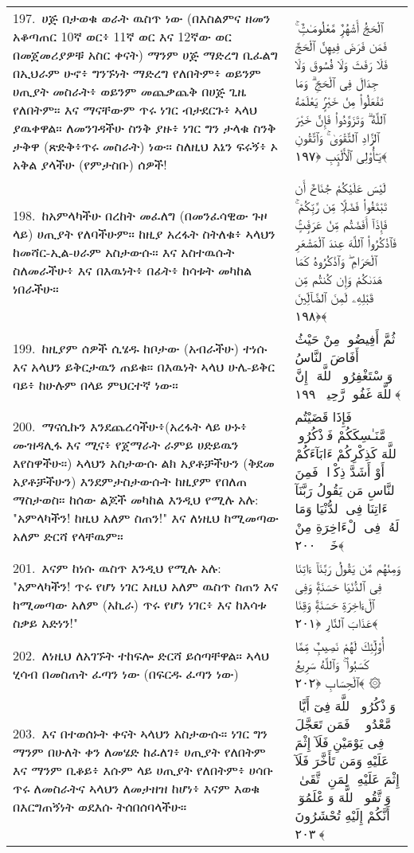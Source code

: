 \documentclass[11pt,a4paper,oneside]{article}%
\newcommand{\mytextarabic}[1]{\textarabic{ #1 \flushright}}
\begin{document}
\begin{longtable}{%
  @{}
    p{}
  @{~~~}
    p{}
    @{}
}
197.\ ሀጅ በታወቁ ወራት ዉስጥ ነው (በእስልምና ዘመን አቆጣጠር 10ኛ ወር፥ 11ኛ ወር እና 12ኛው ወር በመጀመሪያዎቹ አስር ቀናት) ማንም ሀጅ ማድረግ ቢፈልግ በኢህራም ሁኖ፥ ግንኙነት ማድረግ የለበትም፥ ወይንም ሀጢያት መስራት፥ ወይንም መጨቃጨቅ በሀጅ ጊዜ የለበትም። እና ማናቸውም ጥሩ ነገር ብታደርጉ፥ ኣላህ ያዉቀዋል። ለመንገዳችሁ ስንቅ ያዙ፥ ነገር ግን ታላቁ ስንቅ ታቅዋ (ጽድቅ፥ጥሩ መስራት) ነው። ስለዚህ እኔን ፍሩኝ፥ ኦ አቅል ያላችሁ (የምታስቡ) ሰዎች! &  \mytextarabic{ٱلْحَجُّ أَشْهُرٌۭ مَّعْلُومَـٰتٌۭ ۚ فَمَن فَرَضَ فِيهِنَّ ٱلْحَجَّ فَلَا رَفَثَ وَلَا فُسُوقَ وَلَا جِدَالَ فِى ٱلْحَجِّ ۗ وَمَا تَفْعَلُوا۟ مِنْ خَيْرٍۢ يَعْلَمْهُ ٱللَّهُ ۗ وَتَزَوَّدُوا۟ فَإِنَّ خَيْرَ ٱلزَّادِ ٱلتَّقْوَىٰ ۚ وَٱتَّقُونِ يَـٰٓأُو۟لِى ٱلْأَلْبَٟبِ ﴿١٩٧﴾}\\
198.\ ከአምላካችሁ በረከት መፈለግ (በመንፈሳዊው ጉዞ ላይ) ሀጢያት የለባችሁም። ከዚያ አረፋት ስትለቁ፥ ኣላህን ከመሻር-ኢል-ሀራም አስታውሱ። እና አስተዉሱት ስለመራችሁ፥ እና በእዉነት፥ በፊት፥ ከሳቱት መካከል ነበራችሁ።  &  \mytextarabic{ لَيْسَ عَلَيْكُمْ جُنَاحٌ أَن تَبْتَغُوا۟ فَضْلًۭا مِّن رَّبِّكُمْ ۚ فَإِذَآ أَفَضْتُم مِّنْ عَرَفَٟتٍۢ فَٱذْكُرُوا۟ ٱللَّهَ عِندَ ٱلْمَشْعَرِ ٱلْحَرَامِ ۖ وَٱذْكُرُوهُ كَمَا هَدَىٰكُمْ وَإِن كُنتُم مِّن قَبْلِهِۦ لَمِنَ ٱلضَّآلِّينَ ﴿١٩٨﴾}\\
199.\ ከዚያም ሰዎች ሲሄዱ ከቦታው (አብራችሁ) ተነሱ እና አላህን ይቅርታዉን ጠይቁ። በእዉነት ኣላህ ሁሌ-ይቅር ባይ፥ ከሁሉም በላይ ምህርተኛ ነው። &  \mytextarabic{ ثُمَّ أَفِيضُوا۟ مِنْ حَيْثُ أَفَاضَ ٱلنَّاسُ وَٱسْتَغْفِرُوا۟ ٱللَّهَ ۚ إِنَّ ٱللَّهَ غَفُورٌۭ رَّحِيمٌۭ ﴿١٩٩﴾}\\
200.\ ማናሲኩን እንደጨረሳችሁ፥(አረፋት ላይ ሁኑ፥ ሙዝዳሊፋ እና ሚና፥ የጀማራት ራምይ ሀድይዉን እየስዋችሁ።) ኣላህን አስታውሱ ልክ አያቶቻችሁን (ቅደመ አያቶቻችሁን) እንደምታስታውሱት ከዚያም የበለጠ ማስታወስ። ከሰው ልጆች መካከል እንዲህ የሚሉ አሉ: "አምላካችን! ከዚህ አለም ስጠን!" እና ለነዚህ ከሚመጣው አለም ድርሻ የላቸዉም። &  \mytextarabic{فَإِذَا قَضَيْتُم مَّنَـٰسِكَكُمْ فَٱذْكُرُوا۟ ٱللَّهَ كَذِكْرِكُمْ ءَابَآءَكُمْ أَوْ أَشَدَّ ذِكْرًۭا ۗ فَمِنَ ٱلنَّاسِ مَن يَقُولُ رَبَّنَآ ءَاتِنَا فِى ٱلدُّنْيَا وَمَا لَهُۥ فِى ٱلْءَاخِرَةِ مِنْ خَلَٟقٍۢ ﴿٢٠٠﴾}\\
201.\ እናም ከነሱ ዉስጥ እንዲህ የሚሉ አሉ: "አምላካችን! ጥሩ የሆነ ነገር እዚህ አለም ዉስጥ ስጠን እና ከሚመጣው አለም (አኪራ) ጥሩ የሆነ ነገር፥ እና ከእሳቱ ስቃይ አድነን!" &  \mytextarabic{وَمِنْهُم مَّن يَقُولُ رَبَّنَآ ءَاتِنَا فِى ٱلدُّنْيَا حَسَنَةًۭ وَفِى ٱلْءَاخِرَةِ حَسَنَةًۭ وَقِنَا عَذَابَ ٱلنَّارِ ﴿٢٠١﴾}\\
202.\ ለነዚህ ለአገኙት ተከፍሎ ድርሻ ይሰጣቸዋል። ኣላህ ሂሳብ በመስጠት ፈጣን ነው (በፍርዱ ፈጣን ነው) &  \mytextarabic{أُو۟لَٟٓئِكَ لَهُمْ نَصِيبٌۭ مِّمَّا كَسَبُوا۟ ۚ وَٱللَّهُ سَرِيعُ ٱلْحِسَابِ ﴿٢٠٢﴾ ۞}\\
203.\ እና በተወሰኑት ቀናት ኣላህን አስታውሱ። ነገር ግን ማንም በሁለት ቀን ለመሄድ ከፈለገ፥ ሀጢያት የለበትም እና ማንም ቢቆይ፥ እሱም ላይ ሀጢያት የለበትም፥ ሀሳቡ ጥሩ ለመስራትና ኣላህን ለመታዘዝ ከሆነ፥ እናም እወቁ በእርግጠኝነት ወደእሱ ትሰበሰባላችሁ። &  \mytextarabic{ وَٱذْكُرُوا۟ ٱللَّهَ فِىٓ أَيَّامٍۢ مَّعْدُودَٟتٍۢ ۚ فَمَن تَعَجَّلَ فِى يَوْمَيْنِ فَلَآ إِثْمَ عَلَيْهِ وَمَن تَأَخَّرَ فَلَآ إِثْمَ عَلَيْهِ ۚ لِمَنِ ٱتَّقَىٰ ۗ وَٱتَّقُوا۟ ٱللَّهَ وَٱعْلَمُوٓا۟ أَنَّكُمْ إِلَيْهِ تُحْشَرُونَ ﴿٢٠٣﴾}\\

\end{longtable}
\end{document}
